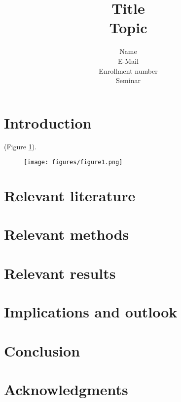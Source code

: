 \documentclass{article} %
\title{Title\\ \vspace{0.5cm}\large{Topic}}
\author{Name \\ E-Mail \\Enrollment number  \\ Seminar}
\begin{document}
\maketitle

\begin{abstract}
\lipsum[1]
\end{abstract}

\section*{Introduction}
\lipsum[2-3] (Figure \ref{fig:figure_01}).

\begin{figure}
    \texttt{[image: figures/figure1.png]}
    \caption{\lipsum[1]}
    \label{fig:figure_01}
\end{figure}

\section*{Relevant literature}
\lipsum[4-6]\cite{Papamakarios2016, Ardizzone2019}

\section*{Relevant methods}
\lipsum[4-6]\cite{Cranmer2020}

\section*{Relevant results}
\lipsum[7-12]\cite{Brehmer2020}

\section*{Implications and outlook}
\lipsum[4-12]\cite{Green2020,Greenberg2019}

\section*{Conclusion}
\lipsum[1-2]

\section*{Acknowledgments}
\lipsum[1]



\end{document}
